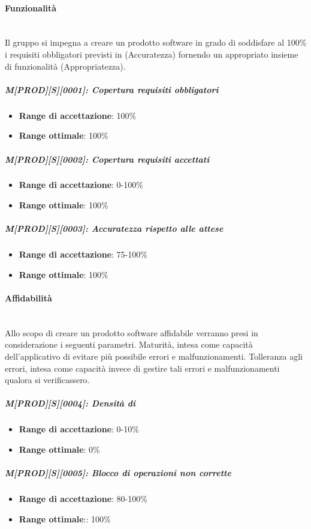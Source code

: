 \paragraph{Funzionalità}
~\\
Il gruppo si impegna a creare un prodotto software in grado di soddisfare al 100\% i requisiti obbligatori previsti in \AdR  (Accuratezza) fornendo un appropriato insieme di funzionalità (Appropriatezza).
\subparagraph{M[PROD][S][0001]: Copertura requisiti obbligatori}
\begin{itemize}
    \item \textbf{Range di accettazione}: 100\%
    \item \textbf{Range ottimale}: 100\%
\end{itemize}
\subparagraph{M[PROD][S][0002]: Copertura requisiti accettati}
\begin{itemize}
    \item \textbf{Range di accettazione}: 0-100\%
    \item \textbf{Range ottimale}: 100\%
\end{itemize}
\subparagraph{M[PROD][S][0003]: Accuratezza rispetto alle attese}
\begin{itemize}
    \item \textbf{Range di accettazione}: 75-100\%
    \item \textbf{Range ottimale}: 100\%
\end{itemize}

\paragraph{Affidabilità}
~\\
Allo scopo di creare un prodotto software affidabile verranno presi in considerazione i seguenti parametri. Maturità, intesa come capacità dell'applicativo di evitare più possibile errori e malfunzionamenti. Tolleranza agli errori, intesa come capacità invece di gestire tali errori e malfunzionamenti qualora si verificassero.

\subparagraph{M[PROD][S][0004]: Densità di }
\begin{itemize}
    \item \textbf{Range di accettazione}: 0-10\%
    \item \textbf{Range ottimale}: 0\%
\end{itemize}
\subparagraph{M[PROD][S][0005]: Blocco di operazioni non corrette}
\begin{itemize}
    \item \textbf{Range di accettazione}: 80-100\%
    \item \textbf{Range ottimale}:: 100\%
\end{itemize}

